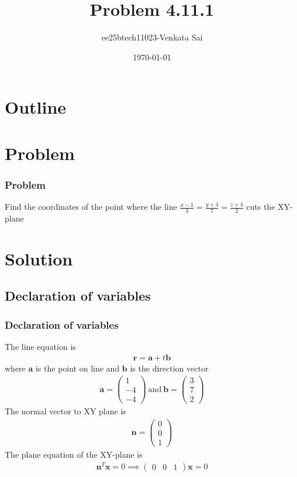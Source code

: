 \documentclass{beamer}
\title{Problem 4.11.1}
\author{ee25btech11023-Venkata Sai}
\date{\today}
\theoremstyle{remark}
\newcommand{\myvec}[1]{\ensuremath{\begin{pmatrix}#1\end{pmatrix}}}
\let\vec\mathbf
\numberwithin{equation}{section}
\begin{document}
\begin{frame}
\titlepage
\end{frame}

\section*{Outline}
\begin{frame}
\tableofcontents
\end{frame}

\section{Problem}

\begin{frame}
\frametitle{Problem}
\setcounter{section}{1}
Find the coordinates of the point where the line  $\frac{x-1}{3} = \frac{y+4}{7} = \frac{z+4}{2}$ cuts the XY-plane 
\end{frame}
\section{Solution}

\subsection{Declaration of variables}
\begin{frame}
\frametitle{Declaration of variables}
The line equation is  
\begin{align}
\vec{r} = \vec{a} + t \vec{b}
\end{align}
where $\vec{a}$ is the point on line and $\vec{b}$ is the direction vector
\begin{align}
\vec{a} = \myvec{1 \\ -4 \\ -4}\ \text{and}\
\vec{b} = \myvec{3 \\ 7 \\ 2}
\end{align}
The normal vector to XY plane is
\begin{align}
\vec{n} = \myvec{0 \\ 0 \\ 1}
\end{align}
The plane equation of the XY-plane is  
\begin{align}
\vec{n}^T \vec{x} = 0 \implies \myvec{0 & 0 & 1}\vec{x}=0
\end{align}
\end{frame}
\end{document}
